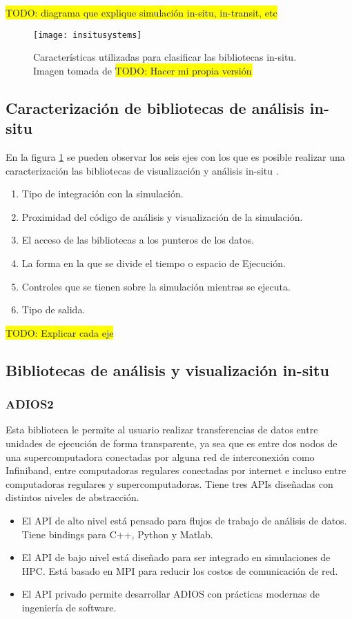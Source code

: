 \colorbox{yellow}{TODO: diagrama que explique simulación in-situ, in-transit, etc}
\begin{figure}
  \texttt{[image: insitusystems]}
  \label{fig:insitusystems}
  \caption{Características utilizadas para clasificar las bibliotecas in-situ. Imagen tomada de \cite{childs_terminology_2020} \colorbox{yellow}{TODO: Hacer mi propia versión}}
\end{figure}
\subsection{Caracterización de bibliotecas de análisis in-situ}
En la figura \ref{fig:insitusystems} se pueden observar los seis ejes con los que es posible realizar una caracterización las bibliotecas de visualización y análisis in-situ \cite{childs_terminology_2020}.
\begin{enumerate}
  \item Tipo de integración con la simulación.
  \item Proximidad del código de análisis y visualización de la simulación.
  \item El acceso de las bibliotecas a los punteros de los datos.
  \item La forma en la que se divide el tiempo o espacio de Ejecución.
  \item Controles que se tienen sobre la simulación mientras se ejecuta.
  \item Tipo de salida.
\end{enumerate}
\colorbox{yellow}{TODO: Explicar cada eje}
\subsection{Bibliotecas de análisis y visualización in-situ}
\subsubsection{ADIOS2}
Esta biblioteca \cite{Godoy2020} le permite al usuario realizar transferencias de datos entre unidades de ejecución de forma transparente, ya sea que es entre dos nodos de una supercomputadora conectadas por alguna red de interconexión como Infiniband, entre computadoras regulares conectadas por internet e incluso entre computadoras regulares y supercomputadoras.
Tiene tres APIs diseñadas con distintos niveles de abstracción.
\begin{itemize}
  \item El API de alto nivel está pensado para flujos de trabajo de análisis de datos. Tiene bindings para C++, Python y Matlab.
  \item El API de bajo nivel está diseñado para ser integrado en simulaciones de HPC. Está basado en MPI para reducir los costos de comunicación de red.
  \item El API privado permite desarrollar ADIOS con prácticas modernas de ingeniería de software.
\end{itemize}
